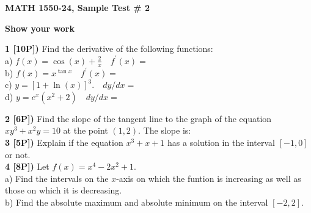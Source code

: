 \documentclass[12pt]{article}
\begin{document}

\centerline{\bf MATH 1550-24, Sample Test \# 2}%
\centerline{\bf Show your work}


{\bf 1 [10P])}  Find the derivative of the following functions:
\\ 
a) $\displaystyle{f(x) = \cos (x)+\frac{2}{x} \quad f^\prime(x) =}$
\\ 

b) $\displaystyle{f(x) =  x^{\tan x} \quad f^\prime(x) =}$
\\  %


c) $ \displaystyle{y = [1  + \ln (x)]^3. \quad dy/dx =}$ %
\\ 

d) $\displaystyle{y = e^x(x^2+2)\quad dy/dx =}$

\vspace{.2in}

{\bf 2 [6P])} 
Find the slope of the tangent line to the graph
of the equation 
$\displaystyle{xy^3+x^2y=10}$
at the point $(1,2)$.
The slope is: %
\\ 

{\bf 3 [5P])}  Explain if the equation $\displaystyle{x^3+x + 1}$ has a solution in the
interval $[-1,0]$ or not.
\\ 

{\bf 4 [8P])} Let $\displaystyle{f(x) = x^4-2x^2+1}$.\\
a) Find the intervals on the $x$-axis on which the funtion is 
increasing as
well as those on which it is decreasing.
\\ 
b) Find the absolute maximum and absolute minimum on the interval
$[-2,2]$.
\\ 

\end{document}
